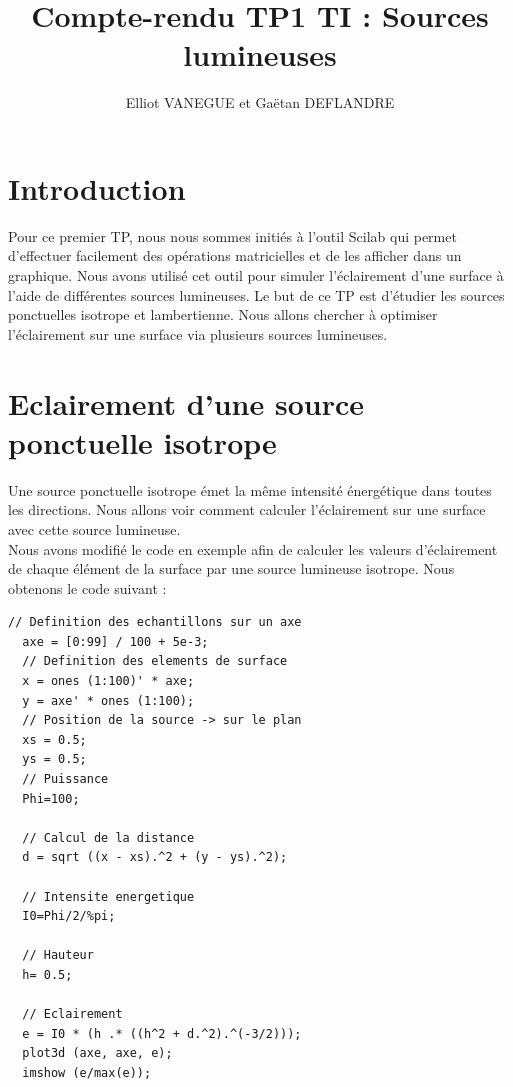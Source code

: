 \documentclass[a4paper,11pt]{article}
\title{Compte-rendu TP1 TI : Sources lumineuses}
\author{Elliot VANEGUE et Gaëtan DEFLANDRE}
\begin{document}


  \maketitle
  
  \mbox{}
  \newpage
  \clearpage
  
  \section*{Introduction}
  Pour ce premier TP, nous nous sommes initiés à l'outil Scilab qui permet d'effectuer facilement des opérations matricielles 
  et de les afficher dans un graphique. Nous avons utilisé cet outil pour simuler l'éclairement d'une surface à l'aide de 
  différentes sources lumineuses. Le but de ce TP est d'étudier les sources ponctuelles isotrope et lambertienne.
  Nous allons chercher à optimiser l'éclairement sur une surface via plusieurs sources lumineuses.
  
  \section{Eclairement d'une source ponctuelle isotrope}
  Une source ponctuelle isotrope émet la même intensité énergétique dans toutes les 
  directions. Nous allons voir comment calculer l'éclairement sur une surface
  avec cette source lumineuse.\\
  
  Nous avons modifié le code en exemple afin de calculer les valeurs d'éclairement de 
  chaque élément de la surface par une source lumineuse isotrope. Nous obtenons le code 
  suivant :
  
  \begin{lstlisting}[caption=Code Scilab eclairement source isotrope]
  // Definition des echantillons sur un axe
  axe = [0:99] / 100 + 5e-3;
  // Definition des elements de surface
  x = ones (1:100)' * axe;
  y = axe' * ones (1:100);
  // Position de la source -> sur le plan
  xs = 0.5;
  ys = 0.5;
  // Puissance
  Phi=100;

  // Calcul de la distance
  d = sqrt ((x - xs).^2 + (y - ys).^2);

  // Intensite energetique
  I0=Phi/2/%pi;

  // Hauteur
  h= 0.5;

  // Eclairement
  e = I0 * (h .* ((h^2 + d.^2).^(-3/2)));
  plot3d (axe, axe, e);
  imshow (e/max(e));
  \end{lstlisting}
  \newpage
  
\end{document}
